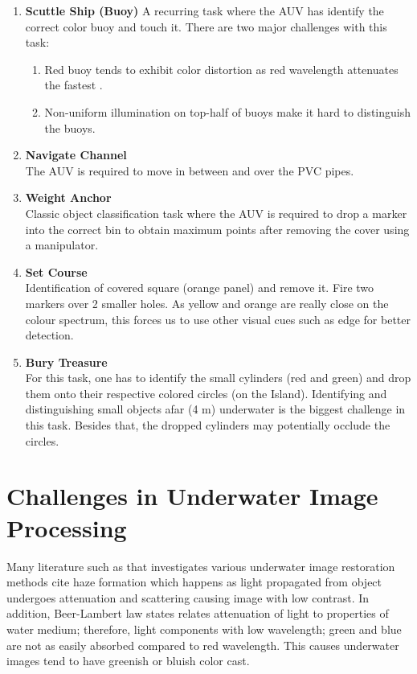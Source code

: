 \begin{enumerate}
    \item \textbf{Scuttle Ship (Buoy)}
        A recurring task where the AUV has identify the correct color buoy and touch it. There are two major challenges with this task:
        \begin{enumerate}[labels=(\alph*)]
        \item Red buoy tends to exhibit color distortion as red wavelength attenuates the fastest \cite{Galdran2015}.
        \item Non-uniform illumination on top-half of buoys make it hard to distinguish the buoys.
        \end{enumerate}
    \item \textbf{Navigate Channel} \\
        The AUV is required to move in between and over the PVC pipes.
    \item \textbf{Weight Anchor} \\
        Classic object classification task where the AUV is required to drop a marker into the correct bin to obtain maximum points after removing the cover using a manipulator.
    \item \textbf{Set Course} \\
        Identification of covered square (orange panel) and remove it. Fire two markers over 2 smaller holes. As yellow and orange are really close on the colour spectrum, this forces us to use other visual cues such as edge for better detection.
    \item \textbf{Bury Treasure} \\
        For this task, one has to identify the small cylinders (red and green) and drop them onto their respective colored circles (on the Island). Identifying and distinguishing small objects afar (4 m) underwater is the biggest challenge in this task. Besides that, the dropped cylinders may potentially occlude the circles.
\end{enumerate}

\section{Challenges in Underwater Image Processing}

Many literature such as  that investigates various underwater image restoration methods cite haze formation which happens as light propagated from object undergoes attenuation and scattering causing image with low contrast. In addition, Beer-Lambert law \cite{gevers2012color} states relates attenuation of light to properties of water medium; therefore, light components with low wavelength; green and blue are not as easily absorbed compared to red wavelength. This causes underwater images tend to have greenish or bluish color cast.

